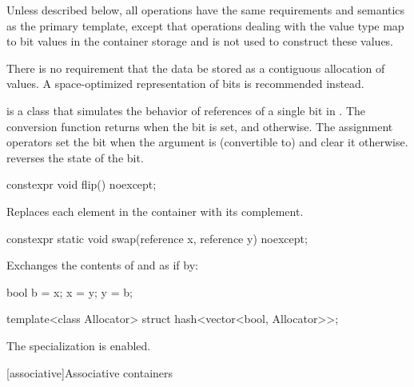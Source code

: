 \pnum
Unless described below, all operations have the same requirements and
semantics as the primary  template, except that operations
dealing with the  value type map to bit values in the
container storage and
is not used to construct these values.

\pnum
There is no requirement that the data be stored as a contiguous allocation
of  values. A space-optimized representation of bits is
recommended instead.

\pnum
{}
is a class that simulates the behavior of references of a single bit in
. The conversion function returns 
when the bit is set, and  otherwise. The assignment operators
set the bit when the argument is (convertible to)  and
clear it otherwise.  reverses the state of the bit.

%
\begin{itemdecl}
constexpr void flip() noexcept;
\end{itemdecl}

\begin{itemdescr}
\pnum
\effects
Replaces each element in the container with its complement.
\end{itemdescr}

%
\begin{itemdecl}
constexpr static void swap(reference x, reference y) noexcept;
\end{itemdecl}

\begin{itemdescr}
\pnum
\effects
Exchanges the contents of  and  as if by:
\begin{codeblock}
bool b = x;
x = y;
y = b;
\end{codeblock}
\end{itemdescr}

\begin{itemdecl}
template<class Allocator> struct hash<vector<bool, Allocator>>;
\end{itemdecl}

\begin{itemdescr}
\pnum
The specialization is enabled.
\end{itemdescr}

[associative]{Associative containers}

